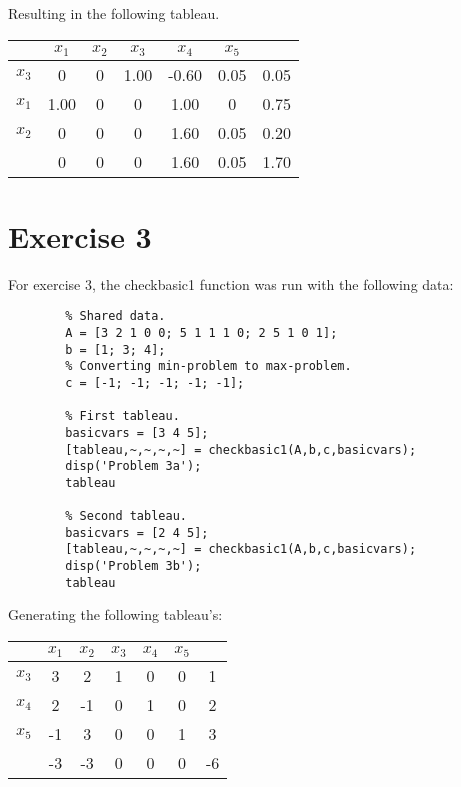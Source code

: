 \documentclass{article}
\begin{document}
    Resulting in the following tableau.

    \begin{center}
        \begin{tabular}{ | c | c c c c c | c | }
            \hline
                   & $x_1$ & $x_2$ & $x_3$ & $x_4$ & $x_5$ &  \\
            \hline
            $x_3$ & 0  & 0   & 1.00 & -0.60   &  0.05   & 0.05  \\
            $x_1$ & 1.00  & 0      & 0    & 1.00&  0   & 0.75 \\
            $x_2$ & 0  & 0  & 0    & 1.60  & 0.05 & 0.20 \\
            \hline
                  & 0  & 0  & 0    & 1.60   &  0.05  & 1.70 \\
            \hline
        \end{tabular}
    \end{center}

\section*{Exercise 3}

    For exercise 3, the checkbasic1 function was run with the following data:

    \begin{lstlisting}
        % Shared data.
        A = [3 2 1 0 0; 5 1 1 1 0; 2 5 1 0 1];
        b = [1; 3; 4];
        % Converting min-problem to max-problem.
        c = [-1; -1; -1; -1; -1];

        % First tableau.
        basicvars = [3 4 5];
        [tableau,~,~,~,~] = checkbasic1(A,b,c,basicvars);
        disp('Problem 3a');
        tableau

        % Second tableau.
        basicvars = [2 4 5];
        [tableau,~,~,~,~] = checkbasic1(A,b,c,basicvars);
        disp('Problem 3b');
        tableau
    \end{lstlisting}

    Generating the following tableau's:

        \begin{center}
            \begin{tabular}{ | c | c c c c c | c | }
                \hline
                       & $x_1$ & $x_2$ & $x_3$ & $x_4$ & $x_5$ &  \\
                \hline
                $x_3$ & 3  & 2   & 1 & 0   &  0   & 1  \\
                $x_4$ & 2  & -1 & 0    & 1 &  0   & 2 \\
                $x_5$ & -1  & 3  & 0    & 0  & 1 & 3 \\
                \hline
                      & -3  & -3  & 0    & 0   &  0  & -6 \\
                \hline
            \end{tabular}
        \end{center}
\end{document}
